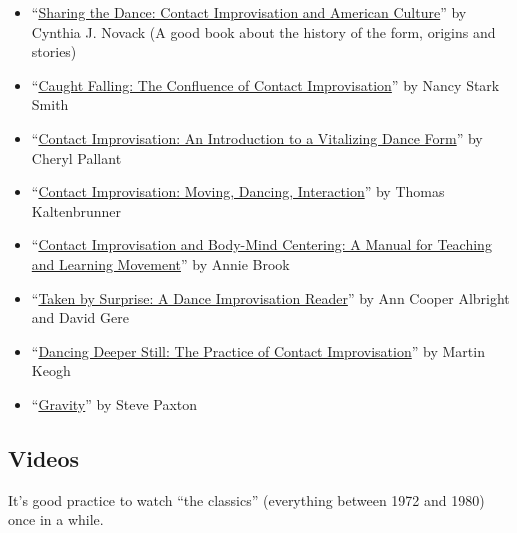 \begin{itemize}
    \setlength\itemsep{0em}
    \item ``\href{https://www.amazon.com/Sharing-Dance-Improvisation-Directions-Anthropological/dp/0299124444}{Sharing the Dance: Contact Improvisation and American Culture}'' by Cynthia J. Novack (A good book about the history of the form, origins and stories)
    \item ``\href{https://www.amazon.com/Caught-Falling-Confluence-Contact-Improvisation/dp/0937645095}{Caught Falling: The Confluence of Contact Improvisation}'' by Nancy Stark Smith
    \item ``\href{https://www.amazon.com/Contact-Improvisation-Introduction-Vitalizing-Dance/dp/0786426470}{Contact Improvisation: An Introduction to a Vitalizing Dance Form}'' by Cheryl Pallant
    \item ``\href{https://www.amazon.com/Contact-Improvisation-Dancing-Interaction-Introduction/dp/1841261386}{Contact Improvisation: Moving, Dancing, Interaction}'' by Thomas Kaltenbrunner
    \item ``\href{https://www.amazon.com/Improvisation-Body-Mind-Centering-Teaching-Learning/dp/0976044900}{Contact Improvisation and Body-Mind Centering: A Manual for Teaching and Learning Movement}'' by Annie Brook
    \item ``\href{https://www.amazon.com/Taken-Surprise-Dance-Improvisation-Reader/dp/0819566489}{Taken by Surprise: A Dance Improvisation Reader}'' by Ann Cooper Albright and David Gere
    \item ``\href{https://www.amazon.com/Dancing-Deeper-Still-Practice-Improvisation/dp/1775243044}{Dancing Deeper Still: The Practice of Contact Improvisation}'' by Martin Keogh
    \item ``\href{https://contredanse.org/en/product/gravity/}{Gravity}'' by Steve Paxton
\end{itemize}

\subsection{Videos}\label{subsec:videos}

It's good practice to watch ``the classics'' (everything between 1972 and 1980) once in a while.

